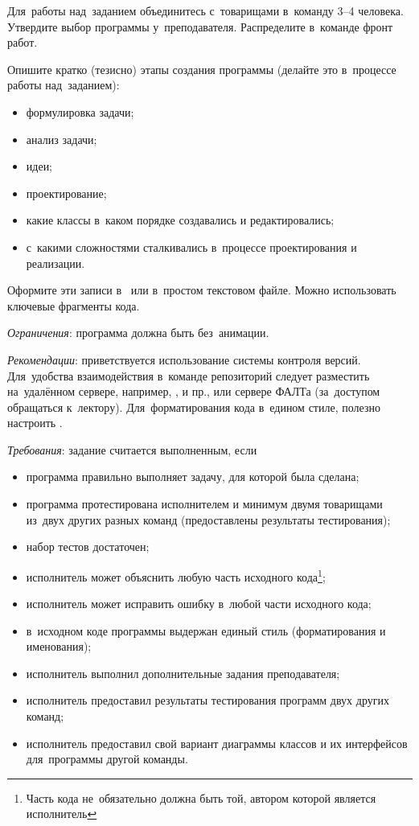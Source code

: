 \documentclass[a4paper,11pt,landscape,notitlepage,oneside,openany,final]{memoir}
\begin{document}
Для~работы над~заданием объединитесь с~товарищами в~команду 3--4 человека. Утвердите выбор программы у~преподавателя. Распределите в~команде фронт работ.

Опишите кратко (тезисно) этапы создания программы (делайте это в~процессе работы над~заданием):

\begin{itemize}
    \item формулировка задачи;
    \item анализ задачи;
    \item идеи;
    \item проектирование;
    \item какие классы в~каком порядке создавались и редактировались;
    \item с~какими сложностями сталкивались в~процессе проектирования и реализации.
\end{itemize}

Оформите эти записи в~\href{https://ru.wikipedia.org/wiki/Markdown}{} или в~простом текстовом файле. Можно использовать ключевые фрагменты кода.

\medskip

\emph{Ограничения}: программа должна быть без~анимации.

\medskip

\emph{Рекомендации}: приветствуется использование системы контроля версий. Для~удобства взаимодействия в~команде репозиторий следует разместить на~удалённом сервере, например, ,  и пр., или сервере ФАЛТа (за~доступом обращаться к~лектору).
Для~форматирования кода в~едином стиле, полезно настроить .

\medskip

\emph{Требования}: задание считается выполненным, если
\begin{itemize}
    \item программа правильно выполняет задачу, для которой была сделана;
    \item программа протестирована исполнителем и минимум двумя товарищами из~двух других разных команд (предоставлены результаты тестирования);
    \item набор тестов достаточен;
    \item исполнитель может объяснить любую часть исходного кода\footnote{Часть кода не~обязательно должна быть той, автором которой является исполнитель};
    \item исполнитель может исправить ошибку в~любой части исходного кода\footnotemark[\value{footnote}];
    \item в~исходном коде программы выдержан единый стиль (форматирования и именования);
    \item исполнитель выполнил дополнительные задания преподавателя;
    \item исполнитель предоставил результаты тестирования программ двух других команд;
    \item исполнитель предоставил свой вариант диаграммы классов и их интерфейсов для~программы другой команды.
\end{itemize}
\end{document}
